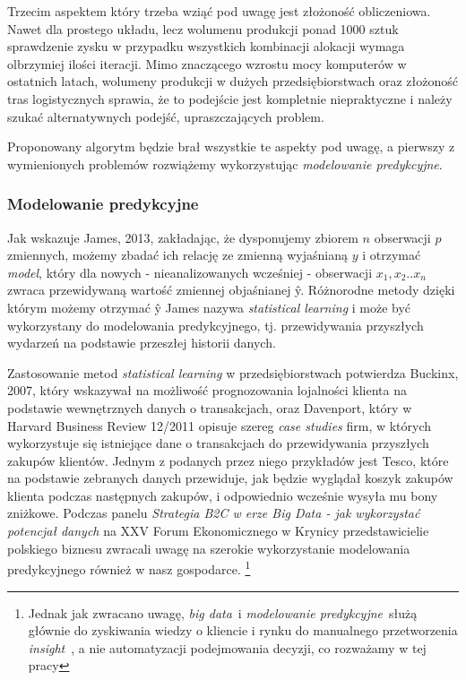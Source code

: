 \documentclass{article}
\begin{document}
Trzecim aspektem który trzeba wziąć pod uwagę jest złożoność obliczeniowa. Nawet dla prostego układu, lecz wolumenu produkcji ponad 1000 sztuk sprawdzenie zysku w przypadku wszystkich kombinacji alokacji wymaga olbrzymiej ilości iteracji. Mimo znaczącego wzrostu mocy komputerów w ostatnich latach, wolumeny produkcji w dużych przedsiębiorstwach oraz złożoność tras logistycznych sprawia, że to podejście jest kompletnie niepraktyczne i należy szukać alternatywnych podejść, upraszczających problem.

 Proponowany algorytm będzie brał wszystkie te aspekty pod uwagę, a pierwszy z wymienionych problemów rozwiążemy wykorzystując  \textit{modelowanie predykcyjne}.

\subsubsection{Modelowanie predykcyjne} 
Jak wskazuje James, 2013, zakładając, że dysponujemy zbiorem $n$ obserwacji $p$ zmiennych, możemy zbadać ich relację ze zmienną wyjaśnianą $y$ i otrzymać \textit{model}, który dla nowych - nieanalizowanych wcześniej - obserwacji $x_1,x_2..x_n$  zwraca przewidywaną wartość zmiennej objaśnianej \^{y}. Różnorodne metody dzięki którym możemy otrzymać \^{y} James nazywa \textit{statistical learning} i może być wykorzystany do modelowania predykcyjnego, tj. przewidywania przyszłych wydarzeń na podstawie przeszłej historii danych. 

Zastosowanie metod \textit{statistical learning} w przedsiębiorstwach potwierdza Buckinx, 2007, który wskazywał na możliwość prognozowania lojalności klienta na podstawie wewnętrznych danych o transakcjach, oraz Davenport, który w Harvard Business Review 12/2011 opisuje szereg  \textit{case studies} firm, w których wykorzystuje się istniejące dane o transakcjach do przewidywania przyszłych zakupów klientów. Jednym z podanych przez niego przykładów jest Tesco, które na podstawie zebranych danych przewiduje, jak będzie wyglądał koszyk zakupów klienta podczas następnych zakupów, i odpowiednio wcześnie wysyła mu bony zniżkowe. Podczas panelu \textit{Strategia B2C w erze Big Data - jak wykorzystać potencjał danych} na XXV Forum Ekonomicznego w Krynicy przedstawicielie polskiego biznesu zwracali uwagę na szerokie wykorzystanie modelowania predykcyjnego również w nasz gospodarce. \footnote{Jednak jak zwracano uwagę, \textit{big data}\ i \textit{modelowanie predykcyjne}\ służą głównie do zyskiwania wiedzy o kliencie i rynku do manualnego przetworzenia \textit{insight}\ , a nie automatyzacji podejmowania decyzji, co rozważamy w tej pracy}
\end{document}
